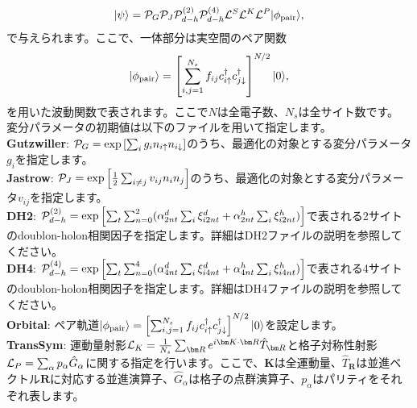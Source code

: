 \begin{description}
\begin{equation}
|\psi \rangle = {\cal P}_G{\cal P}_J{\cal P}_{d-h}^{(2)}{\cal P}_{d-h}^{(4)}{\cal L}^S{\cal L}^K{\cal L}^P |\phi_{\rm pair} \rangle,
\end{equation}
で与えられます。ここで、一体部分は実空間のペア関数
\begin{equation}
|\phi_{\rm pair} \rangle = \left[\sum_{i, j=1}^{N_s} f_{ij}c_{i\uparrow}^{\dag}c_{j\downarrow}^{\dag} \right]^{N/2}|0 \rangle,
\end{equation}
を用いた波動関数で表されます。ここで$N$は全電子数、$N_s$は全サイト数です。
変分パラメータの初期値は以下のファイルを用いて指定します。
~\\{\bf Gutzwiller}: ${\cal P}_G=\exp\left[ \sum_i g_i n_{i\uparrow} n_{i\downarrow} \right]$のうち、最適化の対象とする変分パラメータ$g_i$を指定します。
~\\{\bf Jastrow}: ${\cal P}_J=\exp\left[\frac{1}{2} \sum_{i\neq j} v_{ij} n_i n_j\right]$のうち、最適化の対象とする変分パラメータ$v_{ij}$を指定します。
~\\{\bf DH2}:  ${\cal P}_{d-h}^{(2)}= \exp \left[ \sum_t \sum_{n=0}^2 (\alpha_{2nt}^d \sum_{i}\xi_{i2nt}^d+\alpha_{2nt}^h \sum_{i}\xi_{i2nt}^h)\right]$で表される2サイトのdoublon-holon相関因子を指定します。詳細はDH2ファイルの説明を参照してください。
~\\{\bf DH4}:  ${\cal P}_{d-h}^{(4)}= \exp \left[ \sum_t \sum_{n=0}^4 (\alpha_{4nt}^d \sum_{i}\xi_{i4nt}^d+\alpha_{4nt}^h \sum_{i}\xi_{i4nt}^h)\right]$で表される4サイトのdoublon-holon相関因子を指定します。詳細はDH4ファイルの説明を参照してください。
~\\{\bf Orbital}: ペア軌道$|\phi_{\rm pair} \rangle = \left[\sum_{i, j=1}^{N_s} f_{ij}c_{i\uparrow}^{\dag}c_{j\downarrow}^{\dag} \right]^{N/2}|0 \rangle$を設定します。
~\\{\bf TransSym}: 運動量射影${\cal L}_K=\frac{1}{N_s}\sum_{{\bm R}}e^{i {\bm K} \cdot{\bm R} } \hat{T}_{\bm R}$と格子対称性射影${\cal L}_P=\sum_{\alpha}p_{\alpha} \hat{G}_{\alpha}$に関する指定を行います。ここで、${\bm K}$は全運動量、$\hat{T}_{\bm R}$は並進ベクトル${\bm R}$に対応する並進演算子、$\hat{G}_{\alpha}$は格子の点群演算子、$p_\alpha$はパリティをそれぞれ表します。


\end{description}
